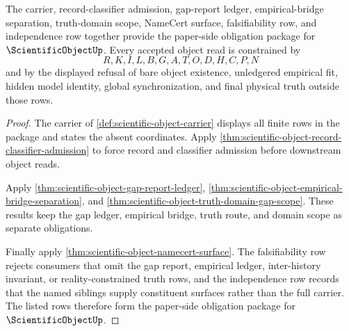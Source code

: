 \begin{theorem}
\label{thm:scientific-object-obligation-closure-package}
The carrier, record-classifier admission, gap-report ledger, empirical-bridge separation, truth-domain scope, NameCert surface, falsifiability row, and independence row together provide the paper-side obligation package for $\ScientificObjectUp$. Every accepted object read is constrained by
$$
R,K,I,L,B,G,A,T,O,D,H,C,P,N
$$
and by the displayed refusal of bare object existence, unledgered empirical fit, hidden model identity, global synchronization, and final physical truth outside those rows.
\end{theorem}
\begin{proof}
The carrier of \autoref{def:scientific-object-carrier} displays all finite rows in the package and states the absent coordinates. Apply \autoref{thm:scientific-object-record-classifier-admission} to force record and classifier admission before downstream object reads.

Apply \autoref{thm:scientific-object-gap-report-ledger}, \autoref{thm:scientific-object-empirical-bridge-separation}, and \autoref{thm:scientific-object-truth-domain-gap-scope}. These results keep the gap ledger, empirical bridge, truth route, and domain scope as separate obligations.

Finally apply \autoref{thm:scientific-object-namecert-surface}. The falsifiability row rejects consumers that omit the gap report, empirical ledger, inter-history invariant, or reality-constrained truth rows, and the independence row records that the named siblings supply constituent surfaces rather than the full carrier. The listed rows therefore form the paper-side obligation package for $\ScientificObjectUp$.
\end{proof}

